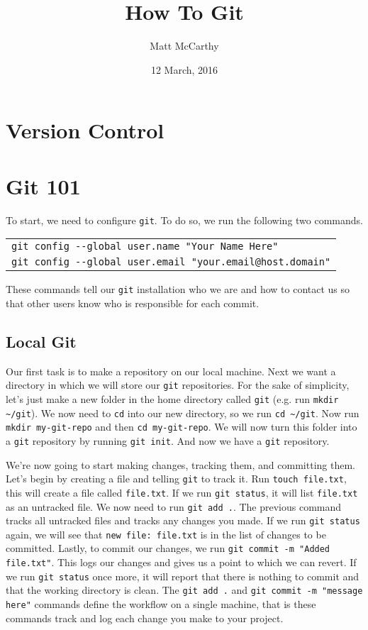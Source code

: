 \documentclass[notitlepage]{simple}
\author{Matt McCarthy}
\title{How To Git}
\date{12 March, 2016}
\begin{document}
\maketitle

\section{Version Control}


\section{Git 101}

To start, we need to configure \verb|git|.
To do so, we run the following two commands.
\begin{center}
	\begin{tabular}{l}
		\verb|git config --global user.name "Your Name Here"|\\
		\verb|git config --global user.email "your.email@host.domain"|
	\end{tabular}
\end{center}
These commands tell our \verb|git| installation who we are and how to contact us so that other users know who is responsible for each commit.

\subsection{Local Git}

Our first task is to make a repository on our local machine.
Next we want a directory in which we will store our \verb|git| repositories.
For the sake of simplicity, let's just make a new folder in the home directory called \verb|git| (e.g. run \verb|mkdir ~/git|).
We now need to \verb|cd| into our new directory, so we run \verb|cd ~/git|.
Now run \verb|mkdir my-git-repo| and then \verb|cd my-git-repo|.
We will now turn this folder into a \verb|git| repository by running \verb|git init|.
And now we have a \verb|git| repository.

We're now going to start making changes, tracking them, and committing them.
Let's begin by creating a file and telling \verb|git| to track it.
Run \verb|touch file.txt|, this will create a file called \verb|file.txt|.
If we run \verb|git status|, it will list \verb|file.txt| as an untracked file.
We now need to run \verb|git add .|.
The previous command tracks all untracked files and tracks any changes you made.
If we run \verb|git status| again, we will see that \verb|new file: file.txt| is in the list of changes to be committed.
Lastly, to commit our changes, we run \verb|git commit -m "Added file.txt"|.
This logs our changes and gives us a point to which we can revert.
If we run \verb|git status| once more, it will report that there is nothing to commit and that the working directory is clean.
The \verb|git add .| and \verb|git commit -m "message here"| commands define the workflow on a single machine, that is these commands track and log each change you make to your project.
\end{document}
